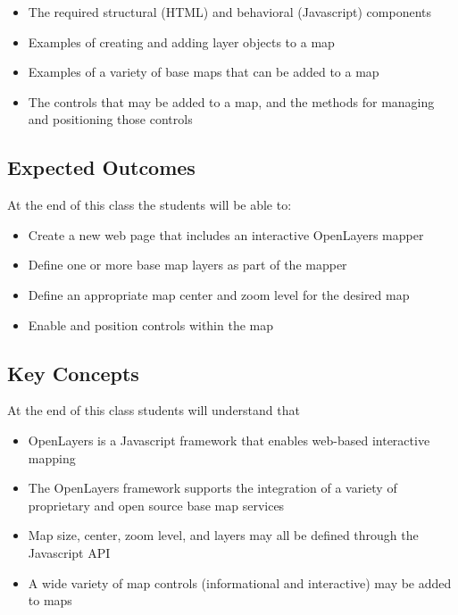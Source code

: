 \documentclass[]{book}
\providecommand{\tightlist}{%
  \setlength{\itemsep}{0pt}\setlength{\parskip}{0pt}}
\begin{document}
\begin{itemize}
\tightlist
\item
  The required structural (HTML) and behavioral (Javascript) components
\item
  Examples of creating and adding layer objects to a map
\item
  Examples of a variety of base maps that can be added to a map
\item
  The controls that may be added to a map, and the methods for managing
  and positioning those controls
\end{itemize}

\subsection{Expected Outcomes}\label{expected-outcomes}

At the end of this class the students will be able to:

\begin{itemize}
\tightlist
\item
  Create a new web page that includes an interactive OpenLayers mapper
\item
  Define one or more base map layers as part of the mapper
\item
  Define an appropriate map center and zoom level for the desired map
\item
  Enable and position controls within the map
\end{itemize}

\subsection{Key Concepts}\label{key-concepts}

At the end of this class students will understand that

\begin{itemize}
\tightlist
\item
  OpenLayers is a Javascript framework that enables web-based
  interactive mapping
\item
  The OpenLayers framework supports the integration of a variety of
  proprietary and open source base map services
\item
  Map size, center, zoom level, and layers may all be defined through
  the Javascript API
\item
  A wide variety of map controls (informational and interactive) may be
  added to maps
\end{itemize}
\end{document}
